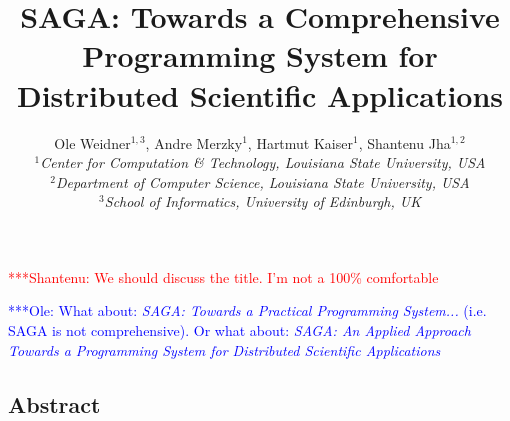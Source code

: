 \documentclass[a4paper,10pt]{article}
\newcommand{\jhanote}[1]{  {\textcolor{red}     { ***Shantenu: #1 }}}
\newcommand{\onote}[1]{  {\textcolor{blue}     { ***Ole: #1 }}}
\newcommand{\jhanote}[1]{}
\newcommand{\onote}[1]{}
\begin{document}
 \title{ \large \vspace{-3.5em} SAGA: Towards a Comprehensive
   Programming System for Distributed Scientific Applications }
 \jhanote{We should discuss the title. I'm not a 100\% comfortable}
 
 \onote{What about: \textit{SAGA: Towards a Practical Programming System...} (i.e. SAGA is not 
 comprehensive). Or what about: \textit{SAGA: An Applied Approach Towards a
   Programming System for Distributed Scientific Applications}}

 
 \author{\normalsize Ole Weidner$^{1,3}$, Andre Merzky$^{1}$, Hartmut Kaiser$^{1}$, Shantenu Jha$^{1,2}$\\
   \small{\emph{$^{1}$Center for Computation \& Technology, Louisiana State University, USA}}\\
   \small{\emph{$^{2}$Department of Computer Science, Louisiana State University, USA}}\\
   \small{\emph{$^{3}$School of Informatics, University of Edinburgh, UK}}\\
 }
 \date{}
 \maketitle
 




\subsection*{Abstract}
\end{document}
